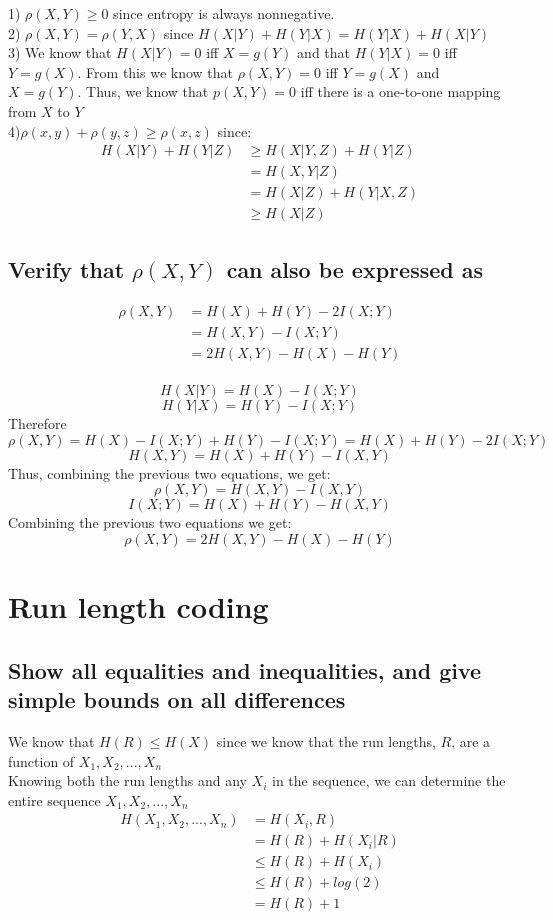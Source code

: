 \documentclass[11pt, oneside]{book}   	%
\begin{document}
1) $\rho(X,Y) \geq 0$ since entropy is always nonnegative.\\
2) $\rho(X,Y)=\rho(Y,X)$ since $H(X|Y)+H(Y|X) = H(Y|X)+H(X|Y)$\\
3) We know that $H(X|Y)=0$ iff $X=g(Y)$ and that $H(Y|X)=0$ iff $Y=g(X)$.  From this we know that $\rho(X,Y)=0$ iff $Y=g(X)$ and $X=g(Y)$.  Thus, we know that $p(X,Y)=0$ iff there is a one-to-one mapping from $X$ to $Y$\\
4)$\rho(x,y)+\rho(y,z) \geq \rho(x,z)$ since:
\begin{equation}
\begin{split}
H(X|Y) + H(Y|Z) & \geq H(X|Y,Z) + H(Y|Z)\\
& = H(X,Y|Z)\\
& = H(X|Z) + H(Y|X,Z)\\
& \geq H(X|Z)
\end{split}
\end{equation}

\subsection{Verify that $\rho (X,Y)$ can also be expressed as}
\begin{equation}\label{}
\begin{split}
 \rho(X,Y) & = H(X) + H(Y) - 2I(X;Y)\\
 & = H(X,Y) - I(X;Y)\\
 & = 2H(X,Y) - H(X) - H(Y)
\end{split}
\end{equation}\\
$$H(X|Y) = H(X) - I(X;Y)$$
$$H(Y|X) = H(Y) - I(X;Y)$$
Therefore
$$\rho(X,Y) = H(X) - I(X;Y) + H(Y) - I(X;Y) = H(X) + H(Y) - 2I(X;Y)$$
$$H(X,Y) = H(X)+H(Y) - I(X,Y)$$
Thus, combining the previous two equations, we get:
$$\rho(X,Y)=H(X,Y)-I(X,Y)$$
$$I(X;Y)=H(X)+H(Y)-H(X,Y)$$
Combining the previous two equations we get:
$$\rho(X,Y)=2H(X,Y)-H(X)-H(Y)$$

\section{Run length coding}
\subsection{Show all equalities and inequalities, and give simple bounds on all differences}
We know that $H(R) \leq H(X)$ since we know that the run lengths, $R$, are a function of $X_1, X_2,...,X_n$\\
Knowing both the run lengths and any $X_i$ in the sequence, we can determine the entire sequence $X_1, X_2,...,X_n$
\begin{equation}\label{}
\begin{split}
 H(X_1, X_2,...,X_n) & = H(X_i,R)\\
 & = H(R) + H(X_i|R)\\
 & \leq H(R) + H(X_i)\\
 & \leq H(R) + log(2)\\
 & = H(R) + 1
\end{split}
\end{equation}
\end{document}

